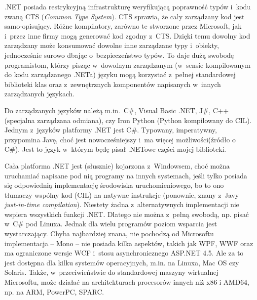 .NET posiada restrykcyjną infrastrukturę weryfikującą poprawność typów i~kodu zwaną CTS (\emph{Common Type System}). CTS sprawia, że cały zarządzany kod jest samo-opisujący. Różne kompilatory, zarówno te stworzone przez Microsoft, jak i~przez inne firmy mogą generować kod zgodny z~CTS. Dzięki temu dowolny kod zarządzany może konsumować dowolne inne zarządzane typy i~obiekty, jednocześnie surowo dbając o~bezpieczeństwo typów. To daje dużą swobodę programistom, którzy pisząc w~dowolnym zarządzanym (w~sensie kompilowanym do kodu zarządzanego .NETa) języku mogą korzystać z~pełnej standardowej biblioteki klas oraz z~zewnętrznych komponentów napisanych w~innych zarządzanych językach.

Do zarządzanych języków należą m.in.\ C\#, Visual Basic .NET, J\#, C++ (specjalna zarządzana odmiana), czy Iron Python (Python kompilowany do CIL). Jednym z~języków platformy .NET jest C\#. Typowany, imperatywny, przypomina Javę, choć jest nowocześniejszy i~ma więcej możliwości(źródło o C\#). Jest to język w~którym będę pisał .NETowe części mojej biblioteki.

Cała platforma .NET jest (słusznie\cite{dotnetrequirements}) kojarzona z~Windowsem, choć można uruchamiać napisane pod nią programy na innych systemach, jeśli tylko posiada się odpowiednią implementację środowiska uruchomieniowego, bo to ono tłumaczy wspólny kod (CIL) na natywne instrukcje (ponownie, znany z~Javy \emph{just-in-time compilation}). Niestety żadna z~alternatywnych implementacji nie wspiera wszystkich funkcji .NET. Dlatego nie można z~pełną swobodą, np. pisać w~C\# pod Linuxa. Jednak dla wielu programów poziom wsparcia jest wystarczający. Chyba najbardziej znana, nie pochodzą od Microsoftu implementacja -- Mono -- nie posiada kilka aspektów, takich jak WPF, WWF oraz ma ograniczone wersje WCF i~stosu asynchronicznego ASP.NET 4.5\cite{monocompatibility}. Ale za to jest dostępna dla kilku systemów operacyjnych, m.in. na Linuxa, Mac OS czy Solaris\cite{monosupportedplatforms}. Także, w~przeciwieństwie do standardowej maszyny wirtualnej Microsoftu, może działać na architekturach procesorów innych niż x86 i AMD64\cite{dotnetrequirements}, np. na ARM, PowerPC, SPARC.

